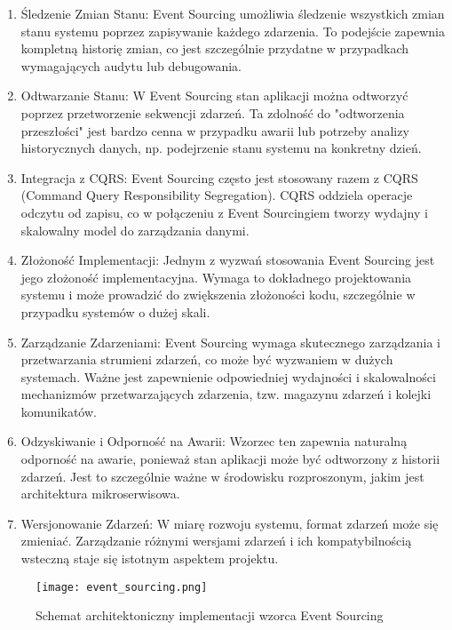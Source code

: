 \begin{enumerate}

    \item Śledzenie Zmian Stanu: Event Sourcing umożliwia śledzenie wszystkich zmian stanu systemu poprzez zapisywanie każdego zdarzenia. To podejście zapewnia kompletną historię zmian, co jest szczególnie przydatne w przypadkach wymagających audytu lub debugowania.

    \item Odtwarzanie Stanu: W Event Sourcing stan aplikacji można odtworzyć poprzez przetworzenie sekwencji zdarzeń. Ta zdolność do "odtworzenia przeszłości" jest bardzo cenna w przypadku awarii lub potrzeby analizy historycznych danych, np. podejrzenie stanu systemu na konkretny dzień.

    \item Integracja z CQRS: Event Sourcing często jest stosowany razem z CQRS (Command Query Responsibility Segregation). CQRS oddziela operacje odczytu od zapisu, co w połączeniu z Event Sourcingiem tworzy wydajny i skalowalny model do zarządzania danymi.

    \item Złożoność Implementacji: Jednym z wyzwań stosowania Event Sourcing jest jego złożoność implementacyjna. Wymaga to dokładnego projektowania systemu i może prowadzić do zwiększenia złożoności kodu, szczególnie w przypadku systemów o dużej skali.

    \item Zarządzanie Zdarzeniami: Event Sourcing wymaga skutecznego zarządzania i przetwarzania strumieni zdarzeń, co może być wyzwaniem w dużych systemach. Ważne jest zapewnienie odpowiedniej wydajności i skalowalności mechanizmów przetwarzających zdarzenia, tzw. magazynu zdarzeń i kolejki komunikatów.

    \item Odzyskiwanie i Odporność na Awarii: Wzorzec ten zapewnia naturalną odporność na awarie, ponieważ stan aplikacji może być odtworzony z historii zdarzeń. Jest to szczególnie ważne w środowisku rozproszonym, jakim jest architektura mikroserwisowa.

    \item Wersjonowanie Zdarzeń: W miarę rozwoju systemu, format zdarzeń może się zmieniać. Zarządzanie różnymi wersjami zdarzeń i ich kompatybilnością wsteczną staje się istotnym aspektem projektu.

\end{enumerate}

\begin{figure}[!h]
    \centering \texttt{[image: event\_sourcing.png]}
    \caption{Schemat architektoniczny implementacji wzorca Event Sourcing}
\end{figure}


